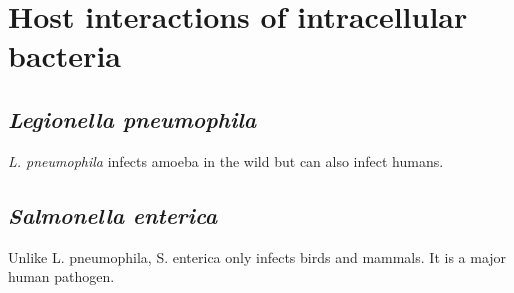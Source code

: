 
\chapter{Host interactions of intracellular bacteria} %

\label{ch:01-03} %


\section{\textit{Legionella pneumophila}}

\textit{L. pneumophila} infects amoeba in the wild but can also infect humans.

\section{\textit{Salmonella enterica}}

Unlike {L. pneumophila}, {S. enterica} only infects birds and mammals. It is a major human pathogen.

